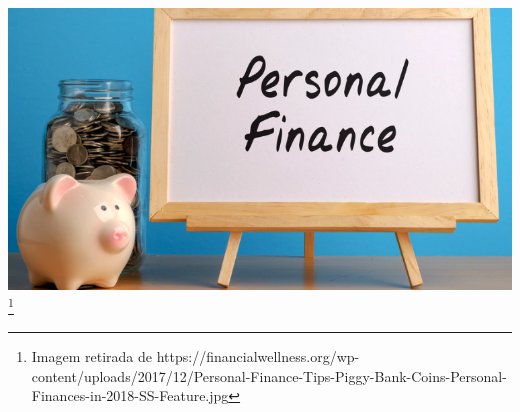 \documentclass[11pt]{beamer}
\begin{document}
\begin{frame}
\includegraphics[scale=0.4]{personalfinance}
\footnote{Imagem retirada de https://financialwellness.org/wp-content/uploads/2017/12/Personal-Finance-Tips-Piggy-Bank-Coins-Personal-Finances-in-2018-SS-Feature.jpg}
\end{frame}
\end{document}
